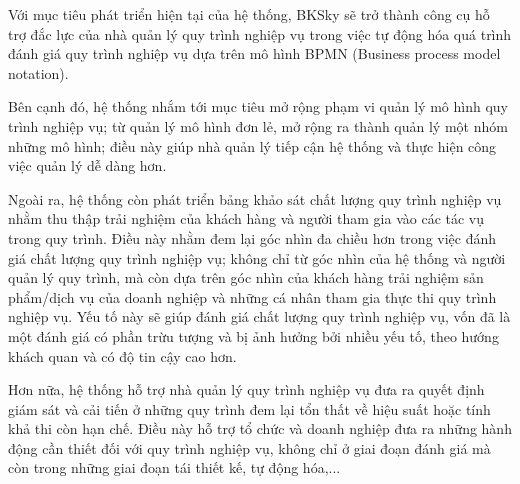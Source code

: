 
Với mục tiêu phát triển hiện tại của hệ thống, BKSky sẽ trở thành công cụ hỗ
trợ đắc lực của nhà quản lý quy trình nghiệp vụ trong việc tự động hóa quá
trình đánh giá quy trình nghiệp vụ dựa trên mô hình BPMN (Business process
model notation).

Bên cạnh đó, hệ thống nhắm tới mục tiêu mở rộng phạm vi quản lý mô hình quy
trình nghiệp vụ; từ quản lý mô hình đơn lẻ, mở rộng ra thành quản lý một nhóm
những mô hình; điều này giúp nhà quản lý tiếp cận hệ thống và thực hiện công
việc quản lý dễ dàng hơn.

Ngoài ra, hệ thống còn phát triển bảng khảo sát chất lượng quy trình nghiệp vụ
nhằm thu thập trải nghiệm của khách hàng và người tham gia vào các tác vụ trong
quy trình. Điều này nhằm đem lại góc nhìn đa chiều hơn trong việc đánh giá chất
lượng quy trình nghiệp vụ; không chỉ từ góc nhìn của hệ thống và người quản lý
quy trình, mà còn dựa trên góc nhìn của khách hàng trải nghiệm sản phẩm/dịch vụ
của doanh nghiệp và những cá nhân tham gia thực thi quy trình nghiệp vụ. Yếu tố
này sẽ giúp đánh giá chất lượng quy trình nghiệp vụ, vốn đã là một đánh giá có
phần trừu tượng và bị ảnh hưởng bởi nhiều yếu tố, theo hướng khách quan và có
độ tin cậy cao hơn.

Hơn nữa, hệ thống hỗ trợ nhà quản lý quy trình nghiệp vụ đưa ra quyết định giám
sát và cải tiến ở những quy trình đem lại tổn thất về hiệu suất hoặc tính khả
thi còn hạn chế. Điều này hỗ trợ tổ chức và doanh nghiệp đưa ra những hành động
cần thiết đối với quy trình nghiệp vụ, không chỉ ở giai đoạn đánh giá mà còn
trong những giai đoạn tái thiết kế, tự động hóa,...